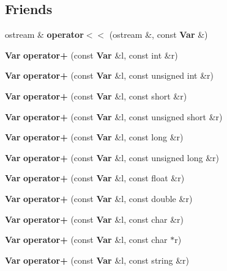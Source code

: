 \subsection*{Friends}
\begin{CompactItemize}
\item 
ostream \& \textbf{operator$<$$<$} (ostream \&, const {\bf Var} \&)\label{classVar_4e11abfa7ef2661cb2d8d3122aa72520}

\item 
{\bf Var} \textbf{operator+} (const {\bf Var} \&l, const int \&r)\label{classVar_82df12b1a94c2bfad03f945470c56ffd}

\item 
{\bf Var} \textbf{operator+} (const {\bf Var} \&l, const unsigned int \&r)\label{classVar_fd1602a96ba16d51bbabfc1790d280cf}

\item 
{\bf Var} \textbf{operator+} (const {\bf Var} \&l, const short \&r)\label{classVar_85aebdea490c1ebdc494a6b8a0ffc223}

\item 
{\bf Var} \textbf{operator+} (const {\bf Var} \&l, const unsigned short \&r)\label{classVar_eb6bc49cd9e1ace436ce0d0779ce9cc9}

\item 
{\bf Var} \textbf{operator+} (const {\bf Var} \&l, const long \&r)\label{classVar_b2b15879da0782d15c1527f38917e510}

\item 
{\bf Var} \textbf{operator+} (const {\bf Var} \&l, const unsigned long \&r)\label{classVar_28a32c2d210b53b168d3f1bc324d7299}

\item 
{\bf Var} \textbf{operator+} (const {\bf Var} \&l, const float \&r)\label{classVar_f2d950dec527d16635fce4814b9a73e2}

\item 
{\bf Var} \textbf{operator+} (const {\bf Var} \&l, const double \&r)\label{classVar_85098fe1ba5b2bd119cf756cdd12ccd3}

\item 
{\bf Var} \textbf{operator+} (const {\bf Var} \&l, const char \&r)\label{classVar_a703ec49a60910c50db9ddd8a08bc313}

\item 
{\bf Var} \textbf{operator+} (const {\bf Var} \&l, const char $\ast$r)\label{classVar_ad144f600d9775dce7d57cb548f7f90f}

\item 
{\bf Var} \textbf{operator+} (const {\bf Var} \&l, const string \&r)\label{classVar_ef495115b59b28838c8e2f8aaa115989}


\end{CompactItemize}
